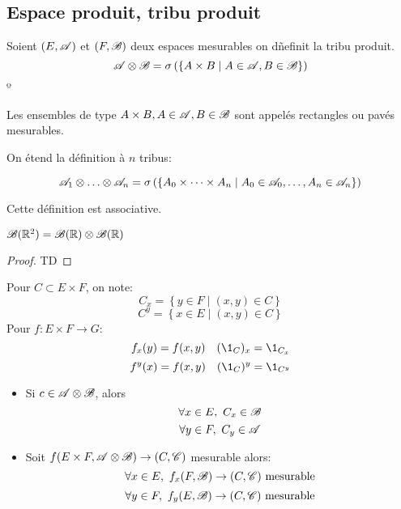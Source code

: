 \subsection{Espace produit, tribu produit}



\begin{definition}
	Soient $(E,\mathscr{A})$ et $(F,\mathscr{B})$ deux espaces mesurables on dñefinit la tribu produit.
	$$\mathscr{A} \otimes \mathscr{B} = \sigma \left(\left\{ A \times B \mid A\in \mathscr{A}, B \in \mathscr{B} \right\}\right)$$º
\end{definition}

\begin{remarque}
	Les ensembles de type $A\times B, A\in \mathscr{A}, B\in\mathscr{B}$ sont appelés rectangles ou pavés mesurables.
\end{remarque}


\begin{definition}
	On étend la définition à $n$ tribus:

	$$\triA_1 \xor \dots \xor \triA_n = \sigma \left(\left\{ A_0 \times \dots \times A_n \mid A_0\in \triA_0, \dots , A_n \in \triA_n \right\}\right)$$

	Cette définition est associative.
\end{definition}

\begin{prop}
	$\mathscr{B}(\mathbb{R}^2) = \mathscr{B}(\mathbb{R}) \otimes \mathscr{B}(\mathbb{R})$
\end{prop}

\begin{proof}
    TD %
\end{proof}

\begin{notation}
	Pour $C \subset E \times F$, on note:
	$$ C_x = \left\{ y \in F \mid (x,y) \in C \right\} $$
	$$ C^y = \left\{ x \in E \mid (x,y) \in C \right\} $$
	Pour $f: E \times F \to G$:
	$$f_x(y) = f(x,y) \quad (\1_C)_x = \1_{C_x}$$
	$$f^y(x) = f(x,y) \quad (\1_C)^y = \1_{C^y} $$
\end{notation}

\begin{prop}
	\begin{itemize}
		\item Si $c \in \mathscr{A} \otimes \mathscr{B}$, alors
		      $$\forall x \in E,\ C_x \in \mathscr{B}$$
		      $$\forall y \in F,\ C_y \in \mathscr{A}$$
		\item Soit $f (E\times F, \mathscr{A} \otimes \mathscr{B}) \to (C, \mathscr{C})$ mesurable alors:
		      $$\forall x \in E, \ f_x (F, \mathscr{B})  \to (C, \mathscr{C}) \text{ mesurable}$$
		      $$\forall y \in F, \ f_y (E, \mathscr{B})  \to (C, \mathscr{C}) \text{ mesurable}$$
	\end{itemize}
\end{prop}


